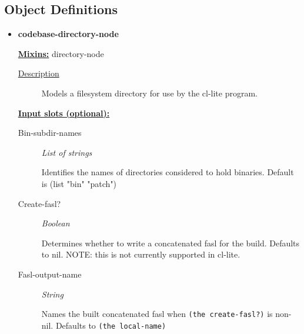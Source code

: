 \documentclass [11pt]{book}
\begin{document}
\subsection{Object Definitions}

\label{subsec:objectdefinitions}



\begin{itemize}

\item {}
\label{prim:codebase-directory-node}
\textbf{codebase-directory-node}


\textbf{
\underline{Mixins:}} directory-node





\begin{description}

\item [
\underline{Description}]


Models a filesystem directory for use by the cl-lite program.



\end{description}








\textbf{
\underline{Input slots (optional):}}

\begin{description}

\item [Bin-subdir-names]
\emph{List of strings}

 Identifies the names of directories considered to hold binaries.
Default is (list "bin" "patch")




\item [Create-fasl?]
\emph{Boolean}

 Determines whether to write a concatenated fasl for the build. Defaults to nil.
NOTE: this is not currently supported in cl-lite.




\item [Fasl-output-name]
\emph{String}

 Names the built concatenated fasl when \texttt{(the create-fasl?)} is non-nil.
Defaults to \texttt{(the local-name)}





\end{description}
\end{itemize}
\end{document}
